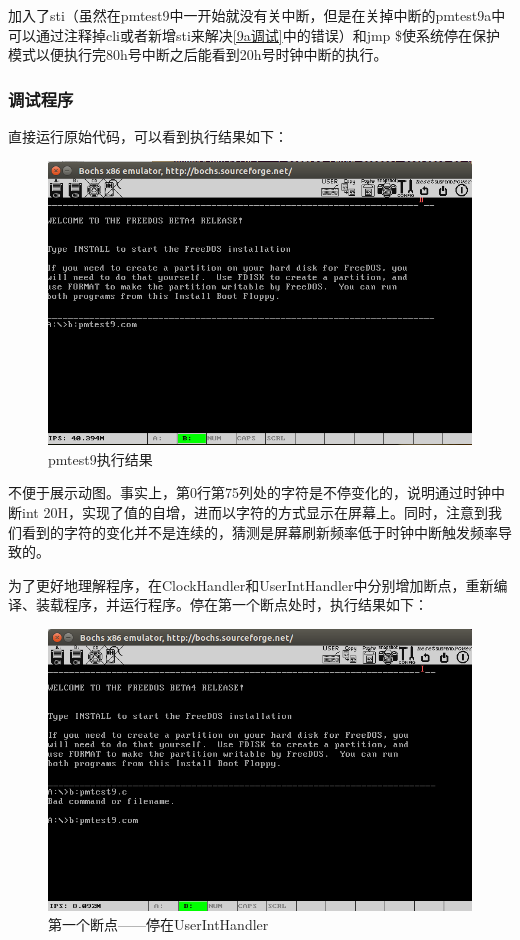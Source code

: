 \documentclass[UTF8,12pt]{ctexart}
\begin{document}
    加入了sti（虽然在pmtest9中一开始就没有关中断，但是在关掉中断的pmtest9a中可以通过注释掉cli或者新增sti来解决\ref{9a调试}中的错误）和jmp \$使系统停在保护模式以便执行完80h号中断之后能看到20h号时钟中断的执行。
    
    \subsubsection{调试程序}
    直接运行原始代码，可以看到执行结果如下：
    \begin{figure}[H]
        \centering
        \includegraphics[width=12cm]{images/pmtest9执行结果.png}
        \caption{pmtest9执行结果}
        \label{pmtest9}
    \end{figure}
    
    不便于展示动图。事实上，第0行第75列处的字符是不停变化的，说明通过时钟中断int 20H，实现了值的自增，进而以字符的方式显示在屏幕上。同时，注意到我们看到的字符的变化并不是连续的，猜测是屏幕刷新频率低于时钟中断触发频率导致的。
    
    为了更好地理解程序，在ClockHandler和UserIntHandler中分别增加断点，重新编译、装载程序，并运行程序。停在第一个断点处时，执行结果如下：
    \begin{figure}[H]
        \centering
        \includegraphics[width=12cm]{images/show_I.png}
        \caption{第一个断点——停在UserIntHandler}
        \label{breakpoint1}
    \end{figure}
    
\end{document}

